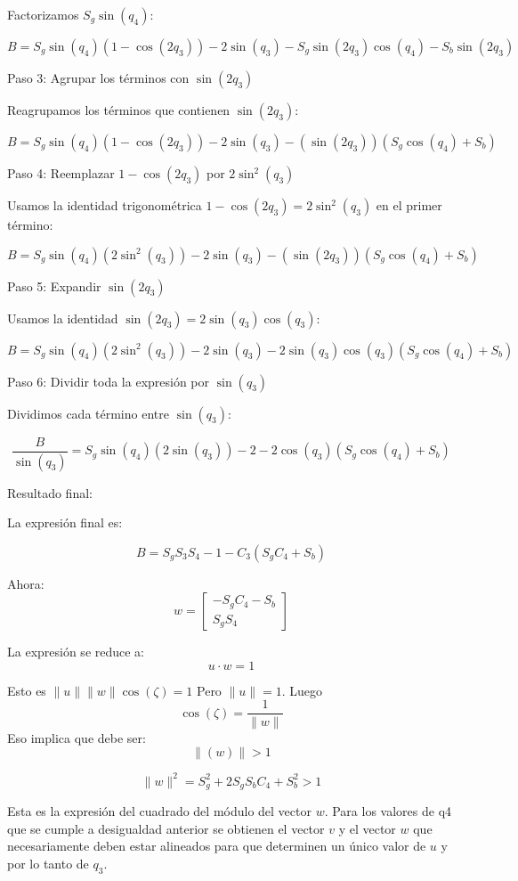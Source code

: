 \documentclass[a4paper,12pt]{article}
\begin{document}
Factorizamos \( S_g \sin(q_4) \):

\[
B = S_g \sin(q_4)(1 - \cos(2q_3)) - 2\sin(q_3) - S_g \sin(2q_3)\cos(q_4) - S_b \sin(2q_3)
\]

 Paso 3: Agrupar los términos con \( \sin(2q_3) \)

Reagrupamos los términos que contienen \( \sin(2q_3) \):

\[
B = S_g \sin(q_4)(1 - \cos(2q_3)) - 2\sin(q_3) - (\sin(2q_3))(S_g \cos(q_4) + S_b)
\]

 Paso 4: Reemplazar \( 1 - \cos(2q_3) \) por \( 2\sin^2(q_3) \)

Usamos la identidad trigonométrica \( 1 - \cos(2q_3) = 2\sin^2(q_3) \) en el primer término:

\[
B = S_g \sin(q_4)(2\sin^2(q_3)) - 2\sin(q_3) - (\sin(2q_3))(S_g \cos(q_4) + S_b)
\]

 Paso 5: Expandir \( \sin(2q_3) \)

Usamos la identidad \( \sin(2q_3) = 2\sin(q_3)\cos(q_3) \):

\[
B = S_g \sin(q_4)(2\sin^2(q_3)) - 2\sin(q_3) - 2\sin(q_3)\cos(q_3)(S_g \cos(q_4) + S_b)
\]

 Paso 6: Dividir toda la expresión por \( \sin(q_3) \)

Dividimos cada término entre \( \sin(q_3) \):

\[
\frac{B}{\sin(q_3)} = S_g \sin(q_4)(2\sin(q_3)) - 2 - 2\cos(q_3)(S_g \cos(q_4) + S_b)
\]

 Resultado final:

La expresión final es:

\[
B= S_g S_3S_4 - 1 - C_3(S_g C_4 + S_b)
\]

Ahora: 
\begin{equation}
    w =
    \begin{bmatrix}
        -S_gC_4 - S_b\\
        S_gS_4
    \end{bmatrix}
\end{equation}

La expresión se reduce a:
\[u \cdot w = 1\]

Esto es $\parallel u \parallel \parallel w \parallel \cos(\zeta) = 1$
Pero $\parallel u \parallel  = 1$. Luego
\[
    \cos(\zeta) = \frac{1}{\parallel w \parallel}
\]
Eso implica que debe ser:
\[
    \parallel(w) \parallel > 1
\]

\[
\|w\|^2 = S_g^2 + 2S_g S_b C_4 + S_b^2 > 1
\]

Esta es la expresión del cuadrado del módulo del vector \( w \).
Para los valores de q4 que se cumple a desigualdad anterior se obtienen
el vector $v$ y el vector $w$ que necesariamente deben estar alineados para que
determinen un único valor de $u$ y por lo tanto de $q_3$.
\end{document}
